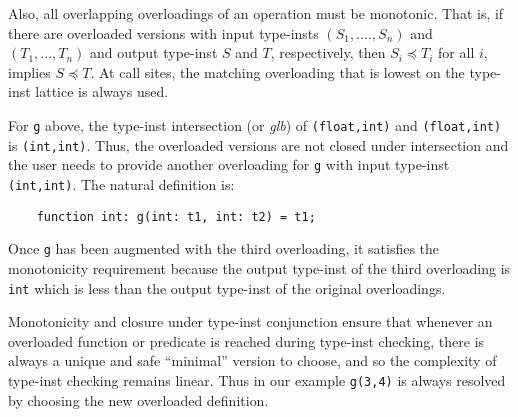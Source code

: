 \documentclass[10pt]{scrartcl}
\begin{document}
\begin{enumerate}
Also, all overlapping overloadings of an operation must be monotonic.  That
is, if there are overloaded versions with input type-insts $(S_1,....,S_n)$
and $(T_1,...,T_n)$ and output type-inst $S$ and $T$, respectively, then
$S_i \preceq T_i$ for all $i$, implies $S \preceq T$.  At call sites, the
matching overloading that is lowest on the type-inst lattice is always used.

For \texttt{g} above, the type-inst intersection (or \emph{glb}) of
\texttt{(float,int)}  and \texttt{(float,int)} is
\texttt{(int,int)}.  Thus, the overloaded versions are not closed under
intersection and the user needs to provide another overloading for
\texttt{g} with input type-inst \texttt{(int,int)}.  The natural
definition is:
\begin{verbatim}
    function int: g(int: t1, int: t2) = t1;
\end{verbatim}
Once \texttt{g} has been augmented with the third overloading, it satisfies
the monotonicity requirement because the output type-inst of the third
overloading is \texttt{int} which is less than the output
type-inst of the original overloadings.

Monotonicity and closure under type-inst conjunction ensure that whenever an
overloaded function or predicate is reached during type-inst checking, there
is always a unique and safe ``minimal'' version to choose, and so the
complexity of type-inst checking remains linear.  Thus in our example
\texttt{g(3,4)} is always resolved by choosing the new overloaded
definition.
\end{enumerate}
\end{document}
